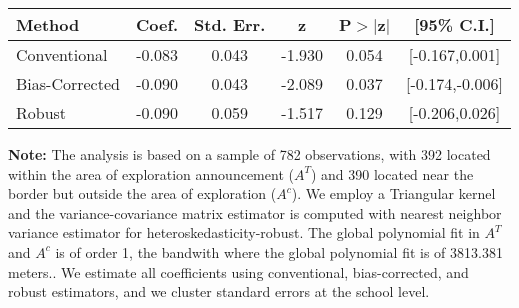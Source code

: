 \begin{table}[htbp]\centering
 \footnotesize 
\begin{tabular}{lccccc}
\hline\hline
Method & Coef. & Std. Err. & z & P$>|$z$|$ & [95\% C.I.] \\ 
\hline \hline  
Conventional & -0.083 & 0.043 & -1.930 & 0.054 & [-0.167,0.001] \\ 
 Bias-Corrected & -0.090 & 0.043 & -2.089 & 0.037 & [-0.174,-0.006] \\ 
Robust & -0.090 & 0.059 & -1.517 & 0.129 & [-0.206,0.026] \\ 
  \hline\hline
\end{tabular}
\label{table:rd}
\begin{tablenotes} 
  \justifying \tiny \textbf{Note: }    
   The analysis is based on a sample of 782 observations, with 392 located within the area of exploration announcement ($A^{T}$) and 390 located near the border but outside the area of exploration  ($A^{c}$). 
           We employ a Triangular kernel and the variance-covariance matrix estimator is computed with nearest neighbor variance estimator for heteroskedasticity-robust. The global polynomial fit in  $A^{T}$ and $A^{c}$ is of order 1, the bandwith where the global polynomial fit is of 3813.381 meters.. We estimate all coefficients using conventional, bias-corrected, and robust estimators, and we cluster standard errors at the school level. \end{tablenotes} 
 \end{table} 
